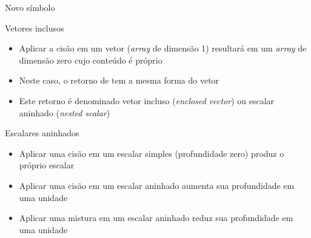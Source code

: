 \begin{frame}[fragile]{Novo símbolo}


\end{frame}

\begin{frame}[fragile]{Vetores inclusos}

    \begin{itemize}
        \item Aplicar a cisão em um vetor  (\textit{array} de dimensão 1) resultará em 
            um \textit{array} de dimensão zero cujo conteúdo é próprio 
        \pause

        \item Neste caso, o retorno de  tem a mesma forma do vetor 
        \pause

        \item Este retorno é denominado vetor incluso (\textit{enclosed vector}) ou escalar 
            aninhado (\textit{nested scalar})
    \end{itemize}

\end{frame}

\begin{frame}[fragile]{Escalares aninhados}

    \begin{itemize}
        \item Aplicar uma cisão em um escalar simples (profundidade zero) produz o próprio escalar
        \pause

        \item Aplicar uma cisão em um escalar aninhado aumenta sua profundidade em uma unidade
        \pause

        \item Aplicar uma mistura em um escalar aninhado reduz sua profundidade em uma unidade
    \end{itemize}

\end{frame}

